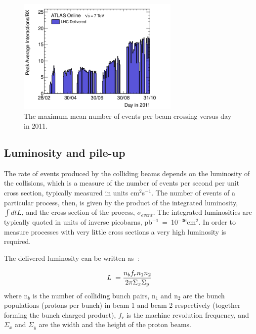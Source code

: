 \begin{figure}[htbp]
  \begin{center}
      \includegraphics[width=0.7\textwidth]{Fig2/peakAvgMuByDay.pdf}
    \caption{The maximum mean number of events per beam crossing versus day in 2011.}
    \label{fig:peakAvgMu}
  \end{center}
\end{figure}


\subsection{Luminosity and pile-up}\label{sec:lumiintro}

The rate of events produced by the colliding beams depends on the luminosity of the collisions, which is a measure of the number of events per second per unit cross section, typically measured in units cm$^2$s$^{-1}$. The number of events of a particular process, then, is given by the product of the integrated luminosity, $\int dt L$, and the cross section of the process, $\sigma_{event}$.  The integrated luminosities are typically quoted in units of inverse picobarns, pb$^{-1}$~=~10$^{-36}$cm$^{2}$. In order to measure processes with very little cross sections a very high luminosity is required. 

The delivered luminosity can be written as~\cite{ATLAS-CONF-2011-116}:

\begin{equation} 
\mbox{ {\it L }} = \frac{n_b f_r n_1 n_2 }{2\pi \Sigma_x \Sigma_y}
\label{eqn:lumi}
\end{equation} 
where n$_b$ is the number of colliding bunch pairs,  n$_1$ and n$_2$ are the bunch populations (protons per bunch) in beam 1 and beam 2 respectively (together forming the bunch charged product), $f_r$ is the machine revolution frequency, and $\Sigma_x$ and $\Sigma_y$ are the width and the height of the proton beams. %

